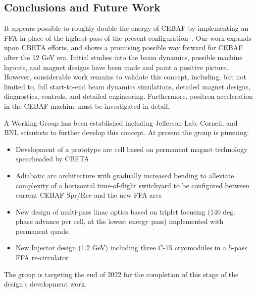 \subsection{Conclusions and Future Work}
It appears possible to roughly double the energy of CEBAF by implementing an FFA in place of the highest pass of the present configuration~\cite{IPAC21:2018bde}. Our work expands upon CBETA efforts, and shows a promising possible way forward for CEBAF after the 12 GeV era. Initial studies into the beam dynamics, possible machine layouts, and magnet designs have been made and paint a positive picture. However, considerable work remains to validate this concept, including, but not limited to, full start-to-end beam dynamics simulations, detailed magnet designs, diagnostics, controls, and detailed engineering. Furthermore, positron acceleration in the CEBAF machine must be investigated in detail.     
%

A Working Group has been established including Jefferson Lab, Cornell, and BNL scientists to further develop this concept. At present the group is pursuing:
\begin{itemize}
  \item Development of  a prototype arc cell based on permanent magnet technology spearheaded by CBETA
  \item Adiabatic arc architecture with gradually increased bending to alleviate complexity of a horizontal time-of-flight switchyard to be configured between current CEBAF Spr/Rec and the new FFA arcs
  \item New design of multi-pass linac optics based on triplet focusing (140 deg. phase advance per cell, at the lowest energy pass) implemented with permanent quads.
  \item New Injector design (1.2 GeV) including three C-75 cryomodules in a 5-pass FFA re-circulator
\end{itemize}
The group is targeting the end of 2022 for the completion of this stage of the design’s development work.